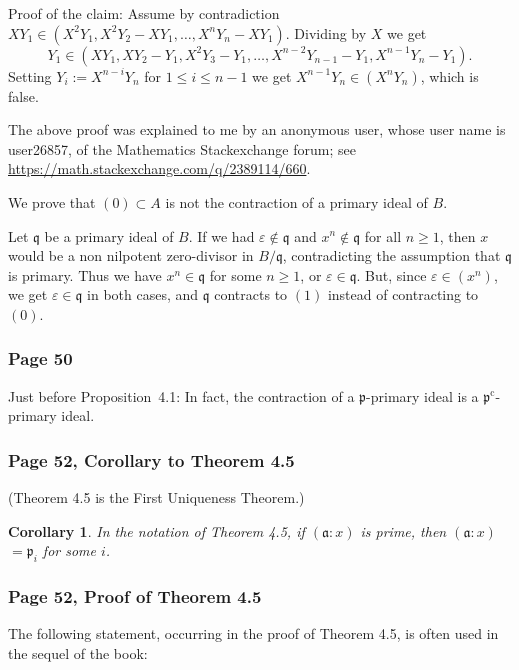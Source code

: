 \documentclass[12pt,letterpaper]{article}%
\newcommand{\oo}{\operatorname}\newcommand{\ooo}{\operatorname*}
\newcommand{\mf}{\mathfrak}
\newcommand{\aaa}{\mf a}
\newcommand{\ppp}{\mf p}
\newcommand{\nn}{\noindent}
\newtheorem{cor}[thm]{Corollary}
\begin{document}
\nn Proof of the claim: Assume by contradiction $XY_1\in(X^2Y_1,X^2Y_2-XY_1,\dots,X^nY_n-XY_1)$. Dividing by $X$ we get 
$$
Y_1\in(XY_1,XY_2-Y_1,X^2Y_3-Y_1,\dots,X^{n-2}Y_{n-1}-Y_1,X^{n-1}Y_n-Y_1).
$$ 
Setting $Y_i:=X^{n-i}Y_n$ for $1\le i\le n-1$ we get $X^{n-1}Y_n\in(X^nY_n)$, which is false. 

The above proof was explained to me by an anonymous user, whose user name is user26857, of the Mathematics Stackexchange forum; see \href{https://math.stackexchange.com/q/2389114/660}{https://math.stackexchange.com/q/2389114/660}. 

We prove that $(0)\subset A$ is not the contraction of a primary ideal of $B$.

Let $\mathfrak q$ be a primary ideal of $B$. If we had $\varepsilon\notin\mathfrak q$ and $x^n\notin\mathfrak q$ for all $n\ge1$, then $x$ would be a non nilpotent zero-divisor in $B/\mathfrak q$, contradicting the assumption that $\mathfrak q$ is primary. Thus we have $x^n\in\mathfrak q$ for some $n\ge1$, or $\varepsilon\in\mathfrak q$. But, since $\varepsilon\in(x^n)$, we get $\varepsilon\in\mathfrak q$ in both cases, and $\mathfrak q$ contracts to $(1)$ instead of contracting to $(0)$.

\subsubsection{Page 50}\label{contrpry}%

Just before Proposition~4.1: In fact, the contraction of a $\ppp$-primary ideal is a $\ppp^{\oo c}$-primary ideal.

\subsubsection{Page 52, Corollary to Theorem 4.5}%

(Theorem 4.5 is the First Uniqueness Theorem.)
\begin{cor}\label{c45}
In the notation of Theorem 4.5, if $(\aaa:x)$ is prime, then $(\aaa:x)$ $=\ppp_i$ for some $i$. 
\end{cor}

\subsubsection{Page 52, Proof of Theorem 4.5}%

The following statement, occurring in the proof of Theorem 4.5, is often used in the sequel of the book:
\end{document}
